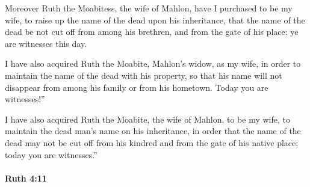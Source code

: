			\begin{versebox}
					\item[BHS] 
					\item[LXX] 
					\item[ASV] Moreover Ruth the Moabitess, the wife of Mahlon, have I purchased to be my wife, to raise up the name of the dead upon his inheritance, that the name of the dead be not cut off from among his brethren, and from the gate of his place: ye are witnesses this day.
					\item[NIV] I have also acquired Ruth the Moabite, Mahlon’s widow, as my wife, in order to maintain the name of the dead with his property, so that his name will not disappear from among his family or from his hometown. Today you are witnesses!”
					\item[NRSV] I have also acquired Ruth the Moabite, the wife of Mahlon, to be my wife, to maintain the dead man’s name on his inheritance, in order that the name of the dead may not be cut off from his kindred and from the gate of his native place; today you are witnesses.”
			\end{versebox}

		\paragraph{Ruth 4:11} %
			\label{RUTH-4-11}

